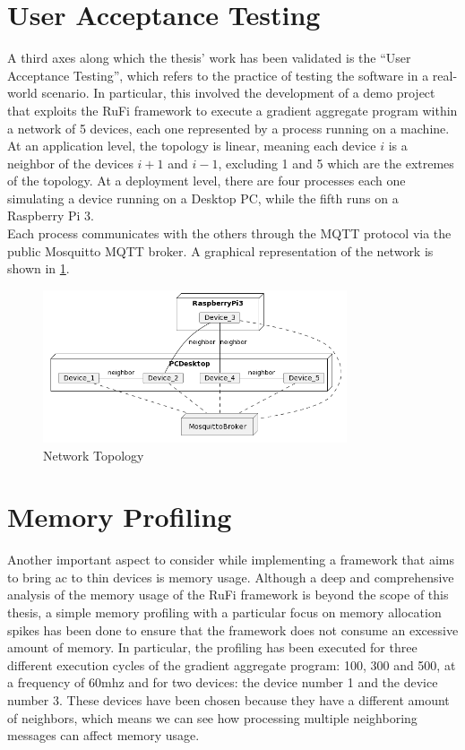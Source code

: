 

\section{User Acceptance Testing}
A third axes along which the thesis' work has been validated is the ``User Acceptance Testing'', which refers to the practice of testing the software in a real-world scenario.
In particular, this involved the development of a demo project that exploits the RuFi framework to execute a gradient aggregate program within a network of 5 devices, each one
represented by a process running on a machine. At an application level, the topology is linear, meaning each device $i$ is a neighbor of the devices $i+1$ and $i-1$, excluding 1 and 5
which are the extremes of the topology. At a deployment level, there are four processes each one simulating a device running on a Desktop PC, while the fifth runs on a Raspberry Pi 3.\\
Each process communicates with the others through the MQTT protocol via the public Mosquitto MQTT broker. A graphical representation of the network is shown in \cref{fig:network_topology}.

\begin{figure}[ht!]
    \centering
    \includegraphics[width=0.8\textwidth]{figures/diagrams/img/deployment-demo.png}
    \caption{Network Topology}
    \label{fig:network_topology}
\end{figure}

\section{Memory Profiling}
Another important aspect to consider while implementing a framework that aims to bring \ac{ac} to thin devices is memory usage. Although a deep and comprehensive analysis of
the memory usage of the RuFi framework is beyond the scope of this thesis, a simple memory profiling with a particular focus on memory allocation spikes has been done to ensure that the framework does not consume an excessive amount of memory.
In particular, the profiling has been executed for three different execution cycles of the gradient aggregate program: 100, 300 and 500, at a frequency of 60mhz and for two devices:
the device number 1 and the device number 3. These devices have been chosen because they have a different amount of neighbors, which means we can see how processing multiple neighboring messages
can affect memory usage.

